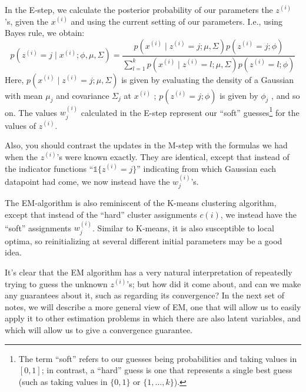 In the E-step, we calculate the posterior probability of our parameters
the $z^{(i)}$ 's, given the $x^{(i)}$ and using the current setting of our parameters. I.e.,
using Bayes rule, we obtain:
\begin{equation*}
    p(z^{(i)} = j \mid x^{(i)} ;\phi,\mu,\Sigma) = \frac{p(x^{(i)} \mid z^{(i)} = j;\mu,\Sigma)p(z^{(i)} = j;\phi)}{\sum^k_{l=1} p(x^{(i)} \mid z^{(i)} = l;\mu,\Sigma)p(z^{(i)} = l;\phi)}
\end{equation*}
Here, $p(x^{(i)} \mid z^{(i)} = j;\mu,\Sigma)$ is given by evaluating the density of a Gaussian
with mean $\mu_j$ and covariance $\Sigma_j$ at $x^{(i)}$ ; $p(z^{(i)} = j;\phi)$ is given by $\phi_j$ , and so
on. The values $w^{(i)}_j$ calculated in the E-step represent our ``soft'' guesses\footnote{
The term ``soft'' refers to our guesses being probabilities and taking values in $[0,1]$; in
contrast, a ``hard'' guess is one that represents a single best guess (such as taking values
in $\{0,1\}$ or $\{1,\ldots,k\}$).} for the values of $z^{(i)}$.

Also, you should contrast the updates in the M-step with the formulas we
had when the $z^{(i)}$'s were known exactly. They are identical, except that instead
of the indicator functions ``$\mathbb{1}\{z^{(i)} = j\}$'' indicating from which Gaussian
each datapoint had come, we now instead have the $w^{(i)}_j$'s.

The EM-algorithm is also reminiscent of the K-means clustering algorithm,
except that instead of the ``hard'' cluster assignments $c(i)$, we instead
have the ``soft'' assignments $w^{(i)}_j$. Similar to K-means, it is also susceptible
to local optima, so reinitializing at several different initial parameters may
be a good idea.

It's clear that the EM algorithm has a very natural interpretation of
repeatedly trying to guess the unknown $z^{(i)}$'s; but how did it come about,
and can we make any guarantees about it, such as regarding its convergence?
In the next set of notes, we will describe a more general view of EM, one
that will allow us to easily apply it to other estimation problems in which
there are also latent variables, and which will allow us to give a convergence
guarantee.
